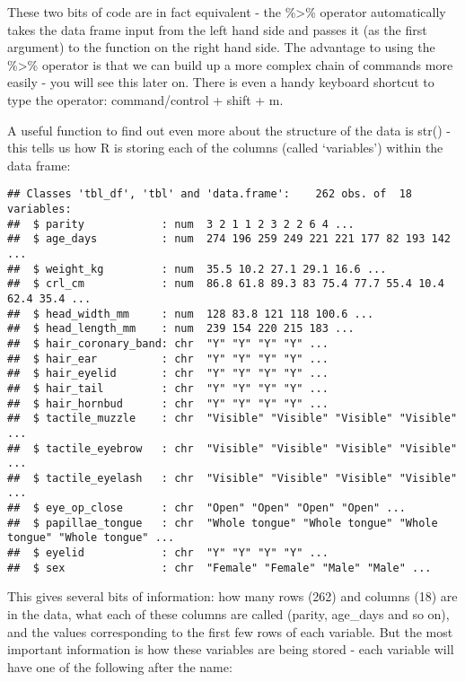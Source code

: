 \documentclass[
]{article}
\newenvironment{Shaded}{\begin{snugshade}}{\end{snugshade}}
\newcommand{\KeywordTok}[1]{\textcolor[rgb]{0.13,0.29,0.53}{\textbf{#1}}}
\newcommand{\NormalTok}[1]{#1}
\newcommand{\OperatorTok}[1]{\textcolor[rgb]{0.81,0.36,0.00}{\textbf{#1}}}
\newcommand{\StringTok}[1]{\textcolor[rgb]{0.31,0.60,0.02}{#1}}
\begin{document}
These two bits of code are in fact equivalent - the \%\textgreater\%
operator automatically takes the data frame input from the left hand
side and passes it (as the first argument) to the function on the right
hand side. The advantage to using the \%\textgreater\% operator is that
we can build up a more complex chain of commands more easily - you will
see this later on. There is even a handy keyboard shortcut to type the
operator: command/control + shift + m.

A useful function to find out even more about the structure of the data
is str() - this tells us how R is storing each of the columns (called
`variables') within the data frame:

\begin{Shaded}
\end{Shaded}

\begin{verbatim}
## Classes 'tbl_df', 'tbl' and 'data.frame':    262 obs. of  18 variables:
##  $ parity            : num  3 2 1 1 2 3 2 2 6 4 ...
##  $ age_days          : num  274 196 259 249 221 221 177 82 193 142 ...
##  $ weight_kg         : num  35.5 10.2 27.1 29.1 16.6 ...
##  $ crl_cm            : num  86.8 61.8 89.3 83 75.4 77.7 55.4 10.4 62.4 35.4 ...
##  $ head_width_mm     : num  128 83.8 121 118 100.6 ...
##  $ head_length_mm    : num  239 154 220 215 183 ...
##  $ hair_coronary_band: chr  "Y" "Y" "Y" "Y" ...
##  $ hair_ear          : chr  "Y" "Y" "Y" "Y" ...
##  $ hair_eyelid       : chr  "Y" "Y" "Y" "Y" ...
##  $ hair_tail         : chr  "Y" "Y" "Y" "Y" ...
##  $ hair_hornbud      : chr  "Y" "Y" "Y" "Y" ...
##  $ tactile_muzzle    : chr  "Visible" "Visible" "Visible" "Visible" ...
##  $ tactile_eyebrow   : chr  "Visible" "Visible" "Visible" "Visible" ...
##  $ tactile_eyelash   : chr  "Visible" "Visible" "Visible" "Visible" ...
##  $ eye_op_close      : chr  "Open" "Open" "Open" "Open" ...
##  $ papillae_tongue   : chr  "Whole tongue" "Whole tongue" "Whole tongue" "Whole tongue" ...
##  $ eyelid            : chr  "Y" "Y" "Y" "Y" ...
##  $ sex               : chr  "Female" "Female" "Male" "Male" ...
\end{verbatim}

This gives several bits of information: how many rows (262) and columns
(18) are in the data, what each of these columns are called (parity,
age\_days and so on), and the values corresponding to the first few rows
of each variable. But the most important information is how these
variables are being stored - each variable will have one of the
following after the name:
\end{document}
